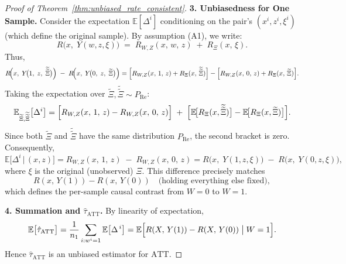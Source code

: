 \documentclass{article}
\theoremstyle{definition}
\begin{document}
\begin{proof}[Proof of Theorem~\ref{thm:unbiased_rate_consistent}]
    \bigskip
    \textbf{3. Unbiasedness for One Sample.}
    Consider the expectation \(\mathbb{E}[\Delta^i]\) conditioning on the pair’s \((x^i,z^i,\xi^i)\) (which define the original sample). By assumption (A1), we write:
    \[
    R\!\bigl(x,\;Y(w,z,\xi)\bigr)
    \;=\;
    R_{W,Z}(x,\,w,\,z)
    \;+\;
    R_{\Xi}(x,\,\xi).
    \]
    Thus,
    \[
    R\!\Bigl(x,\;Y\!\bigl(1,\;z,\;\widetilde{\widetilde{\Xi}}\bigr)\Bigr)
    \;-\;
    R\!\Bigl(x,\;Y\!\bigl(0,\;z,\;\widetilde{\Xi}\bigr)\Bigr)
    =
    \Bigl[R_{W,Z}(x,\,1,\,z) + R_{\Xi}(x,\,\widetilde{\widetilde{\Xi}})\Bigr]
    -
    \Bigl[R_{W,Z}(x,\,0,\,z) + R_{\Xi}(x,\,\widetilde{\Xi})\Bigr].
    \]
    Taking the expectation over \(\widetilde{\Xi}, \widetilde{\widetilde{\Xi}}\sim P_{\mathrm{Re}}\):
    \[
    \mathbb{E}_{\widetilde{\Xi},\widetilde{\widetilde{\Xi}}}\bigl[\Delta^i\bigr]
    =
    \Bigl[
    R_{W,Z}(x,\,1,\,z) - R_{W,Z}(x,\,0,\,z)
    \Bigr]
    \;+\;
    \Bigl[
    \mathbb{E}\!\bigl[R_{\Xi}(x,\widetilde{\widetilde{\Xi}})\bigr]
    - 
    \mathbb{E}\!\bigl[R_{\Xi}(x,\widetilde{\Xi})\bigr]
    \Bigr].
    \]
    Since both \(\widetilde{\Xi}\) and \(\widetilde{\widetilde{\Xi}}\) have the same distribution \(P_{\mathrm{Re}}\), the second bracket is zero. Consequently,
    \[
    \mathbb{E}\bigl[\Delta^i \,\big|\,(x,z)\bigr]
    =
    R_{W,Z}(x,\,1,\,z) \;-\; R_{W,Z}(x,\,0,\,z)
    =
    R\!\bigl(x,\;Y(1,z,\xi)\bigr) \;-\; R\!\bigl(x,\;Y(0,z,\xi)\bigr),
    \]
    where \(\xi\) is the original (unobserved) \(\Xi\). This difference precisely matches
    \[
    R(x,\,Y(1)) - R(x,\,Y(0))
    \quad
    \text{(holding everything else fixed)},
    \]
    which defines the per-sample causal contrast from \(W=0\) to \(W=1\). 
    
    \bigskip
    \textbf{4. Summation and \(\hat{\tau}_{\text{ATT}}\).}
    By linearity of expectation,
    \[
    \mathbb{E}\bigl[\hat{\tau}_{\text{ATT}}\bigr]
    =
    \frac{1}{n_1}\sum_{i: w^i=1}
    \mathbb{E}\bigl[\Delta^{\,i}\bigr]
    =
    \mathbb{E}\Bigl[
    R(X,\,Y(1)) - R(X,\,Y(0)) \;\big|\; W=1
    \Bigr].
    \]
    Hence \(\hat{\tau}_{\text{ATT}}\) is an unbiased estimator for \(\text{ATT}\).
    

\end{proof}
\end{document}
